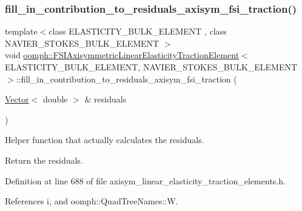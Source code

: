 \subsubsection{\texorpdfstring{fill\+\_\+in\+\_\+contribution\+\_\+to\+\_\+residuals\+\_\+axisym\+\_\+fsi\+\_\+traction()}{fill\_in\_contribution\_to\_residuals\_axisym\_fsi\_traction()}}
{\footnotesize\ttfamily template$<$class E\+L\+A\+S\+T\+I\+C\+I\+T\+Y\+\_\+\+B\+U\+L\+K\+\_\+\+E\+L\+E\+M\+E\+NT , class N\+A\+V\+I\+E\+R\+\_\+\+S\+T\+O\+K\+E\+S\+\_\+\+B\+U\+L\+K\+\_\+\+E\+L\+E\+M\+E\+NT $>$ \\
void \hyperlink{classoomph_1_1FSIAxisymmetricLinearElasticityTractionElement}{oomph\+::\+F\+S\+I\+Axisymmetric\+Linear\+Elasticity\+Traction\+Element}$<$ E\+L\+A\+S\+T\+I\+C\+I\+T\+Y\+\_\+\+B\+U\+L\+K\+\_\+\+E\+L\+E\+M\+E\+NT, N\+A\+V\+I\+E\+R\+\_\+\+S\+T\+O\+K\+E\+S\+\_\+\+B\+U\+L\+K\+\_\+\+E\+L\+E\+M\+E\+NT $>$\+::fill\+\_\+in\+\_\+contribution\+\_\+to\+\_\+residuals\+\_\+axisym\+\_\+fsi\+\_\+traction (\begin{DoxyParamCaption}\item[{\hyperlink{classoomph_1_1Vector}{Vector}$<$ double $>$ \&}]{residuals }\end{DoxyParamCaption})\hspace{0.3cm}{\ttfamily [protected]}}



Helper function that actually calculates the residuals. 

Return the residuals. 

Definition at line 688 of file axisym\+\_\+linear\+\_\+elasticity\+\_\+traction\+\_\+elements.\+h.



References i, and oomph\+::\+Quad\+Tree\+Names\+::W.

\mbox{\label{classoomph_1_1FSIAxisymmetricLinearElasticityTractionElement_ae4a9f997d6975dea6ced9fa21603fc6b}} 
